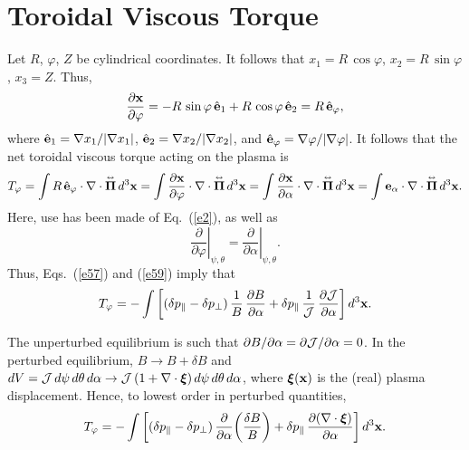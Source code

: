\documentclass[12pt,prb,aps,notitlepage]{revtex4-1}
\newcommand{\bxi}{\mbox{\boldmath$\xi$}}
\newcommand{\bPi}{\mbox{\boldmath$\Pi$}}
\newcommand{\smalltensor}[1]{\overset{\text{\tiny$\leftrightarrow$}}{#1}}
\begin{document}
\section{Toroidal Viscous Torque}
 Let $R$, $\varphi$, $Z$ be cylindrical coordinates. It follows that $x_1=R\,\cos\varphi$, $x_2=R\,\sin\varphi$, $x_3=Z$. Thus,
 \begin{equation}
 \frac{\partial {\bf x}}{\partial\varphi} = -R\,\sin\varphi\,\hat{\bf e}_1+R\,\cos\varphi\,\hat{\bf e}_2= R\,\hat{\bf e}_\varphi,
 \end{equation}
 where $\hat{\bf e}_1=\nabla x_1/|\nabla x_1|$, $\hat{\bf e}_2=\nabla x_2/|\nabla x_2|$, and $\hat{\bf e}_\varphi=\nabla \varphi/|\nabla \varphi|$. 
 It follows that the net toroidal viscous torque acting on the plasma is
 \begin{equation}\label{e59}
 T_\varphi = \int  R\,\hat{\bf e}_\varphi \cdot\nabla\cdot \smalltensor{\bPi}\,d^3{\bf x}= \int  \frac{\partial {\bf x}}{\partial\varphi} \cdot\nabla\cdot \smalltensor{\bPi}\,d^3{\bf x}= \int  \frac{\partial {\bf x}}{\partial\alpha} \cdot\nabla\cdot \smalltensor{\bPi}\,d^3{\bf x} = \int  {\bf e}_\alpha \cdot\nabla\cdot \smalltensor{\bPi}\,d^3{\bf x}.
 \end{equation}
 Here, use has been made of Eq.~(\ref{e2}), as well as 
 \begin{equation}
 \left.\frac{\partial}{\partial\varphi}\right|_{\psi,\theta} = \left.\frac{\partial}{\partial\alpha}\right|_{\psi,\theta}.
 \end{equation}
 Thus, Eqs.~(\ref{e57}) and (\ref{e59}) imply that
 \begin{equation}
 T_\varphi = -\int \left[(\delta p_\parallel-\delta p_\perp)\,\frac{1}{B}\,\frac{\partial B}{\partial \alpha}+\delta p_\parallel\,\frac{1}{{\cal J}}\,\frac{\partial{\cal J}}{\partial \alpha}\right]d^3{\bf x}.
 \end{equation}
 
 The unperturbed equilibrium is such that $\partial B/\partial \alpha =\partial{\cal J}/\partial\alpha=0$. In the perturbed equilibrium, 
 $B\rightarrow B+\delta B$ and 
 $dV= {\cal J}\,d\psi\,d\theta\,d\alpha\rightarrow {\cal J}\,(1+\nabla\cdot\bxi)\,d\psi\,d\theta\,d\alpha$, where $\bxi({\bf x})$ is the (real) plasma displacement. Hence,
 to lowest order in perturbed quantities, 
 \begin{equation}\label{e62}
 T_\varphi = -\int \left[(\delta p_\parallel-\delta p_\perp)\,\frac{\partial}{\partial \alpha}\!\left(\frac{\delta B}{B}\right)+\delta p_\parallel\,\frac{\partial(\nabla\cdot\bxi)}{\partial \alpha}\right]d^3{\bf x}.
 \end{equation}
 
\end{document}
